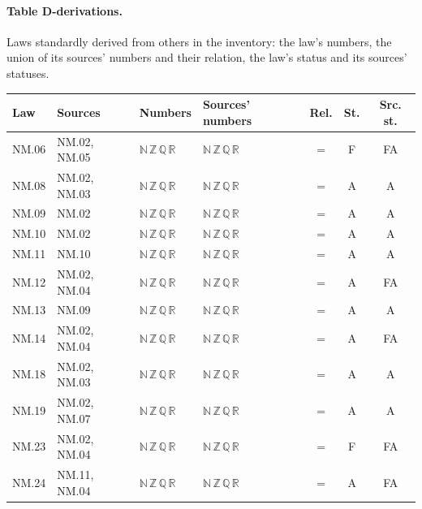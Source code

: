 \paragraph{Table D-derivations.} Laws standardly derived from others in the inventory: the law's numbers, the union of its sources' numbers and their relation, the law's status and its sources' statuses.
{\scriptsize\setlength{\tabcolsep}{3pt}
\begin{longtable}{l l l l c c c}
\toprule
Law & Sources & Numbers & Sources' numbers & Rel. & St. & Src. st. \\
\midrule
\endhead
\bottomrule\endfoot
NM.06 & NM.02, NM.05 & $\mathbb N\,\mathbb Z\,\mathbb Q\,\mathbb R$ & $\mathbb N\,\mathbb Z\,\mathbb Q\,\mathbb R$ & $=$ & F & FA \\
NM.08 & NM.02, NM.03 & $\mathbb N\,\mathbb Z\,\mathbb Q\,\mathbb R$ & $\mathbb N\,\mathbb Z\,\mathbb Q\,\mathbb R$ & $=$ & A & A \\
NM.09 & NM.02 & $\mathbb N\,\mathbb Z\,\mathbb Q\,\mathbb R$ & $\mathbb N\,\mathbb Z\,\mathbb Q\,\mathbb R$ & $=$ & A & A \\
NM.10 & NM.02 & $\mathbb N\,\mathbb Z\,\mathbb Q\,\mathbb R$ & $\mathbb N\,\mathbb Z\,\mathbb Q\,\mathbb R$ & $=$ & A & A \\
NM.11 & NM.10 & $\mathbb N\,\mathbb Z\,\mathbb Q\,\mathbb R$ & $\mathbb N\,\mathbb Z\,\mathbb Q\,\mathbb R$ & $=$ & A & A \\
NM.12 & NM.02, NM.04 & $\mathbb N\,\mathbb Z\,\mathbb Q\,\mathbb R$ & $\mathbb N\,\mathbb Z\,\mathbb Q\,\mathbb R$ & $=$ & A & FA \\
NM.13 & NM.09 & $\mathbb N\,\mathbb Z\,\mathbb Q\,\mathbb R$ & $\mathbb N\,\mathbb Z\,\mathbb Q\,\mathbb R$ & $=$ & A & A \\
NM.14 & NM.02, NM.04 & $\mathbb N\,\mathbb Z\,\mathbb Q\,\mathbb R$ & $\mathbb N\,\mathbb Z\,\mathbb Q\,\mathbb R$ & $=$ & A & FA \\
NM.18 & NM.02, NM.03 & $\mathbb N\,\mathbb Z\,\mathbb Q\,\mathbb R$ & $\mathbb N\,\mathbb Z\,\mathbb Q\,\mathbb R$ & $=$ & A & A \\
NM.19 & NM.02, NM.07 & $\mathbb N\,\mathbb Z\,\mathbb Q\,\mathbb R$ & $\mathbb N\,\mathbb Z\,\mathbb Q\,\mathbb R$ & $=$ & A & A \\
NM.23 & NM.02, NM.04 & $\mathbb N\,\mathbb Z\,\mathbb Q\,\mathbb R$ & $\mathbb N\,\mathbb Z\,\mathbb Q\,\mathbb R$ & $=$ & F & FA \\
NM.24 & NM.11, NM.04 & $\mathbb N\,\mathbb Z\,\mathbb Q\,\mathbb R$ & $\mathbb N\,\mathbb Z\,\mathbb Q\,\mathbb R$ & $=$ & A & FA \\

\end{longtable}}

